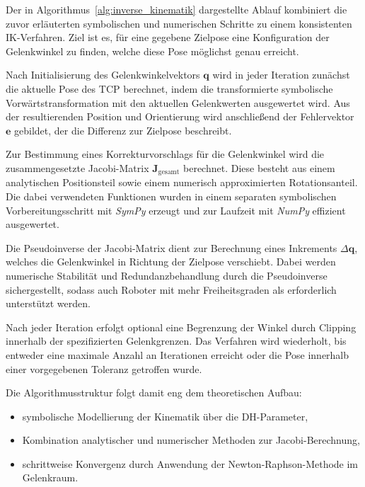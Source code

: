 Der in Algorithmus~\ref{alg:inverse_kinematik} dargestellte Ablauf kombiniert die zuvor erläuterten symbolischen und numerischen Schritte zu einem konsistenten IK-Verfahren. 
Ziel ist es, für eine gegebene Zielpose eine Konfiguration der Gelenkwinkel zu finden, welche diese Pose möglichst genau erreicht.

Nach Initialisierung des Gelenkwinkelvektors $\mathbf{q}$ wird in jeder Iteration zunächst die aktuelle Pose des TCP berechnet,
indem die transformierte symbolische Vor\-wärts\-trans\-for\-ma\-tion mit den aktuellen Gelenkwerten ausgewertet wird. 
Aus der resultierenden Position und Orientierung wird anschließend der Fehlervektor $\mathbf{e}$ gebildet, der die Differenz zur Zielpose beschreibt.

Zur Bestimmung eines Korrekturvorschlags für die Gelenkwinkel wird die zusammengesetzte Jacobi-Matrix $\mathbf{J}_{\text{gesamt}}$ berechnet.
Diese besteht aus einem analytischen Positionsteil sowie einem numerisch approximierten Rotationsanteil.
Die dabei verwendeten Funktionen wurden in einem separaten symbolischen Vorbereitungsschritt mit \textit{SymPy} erzeugt und zur Laufzeit mit \textit{NumPy} effizient ausgewertet.

Die Pseudoinverse der Jacobi-Matrix dient zur Berechnung eines Inkrements $\Delta\mathbf{q}$, welches die Gelenkwinkel in Richtung der Zielpose verschiebt.
Dabei werden numerische Stabilität und Redundanzbehandlung durch die Pseudoinverse sichergestellt, sodass auch Roboter mit mehr Freiheitsgraden als erforderlich unterstützt werden.

Nach jeder Iteration erfolgt optional eine Begrenzung der Winkel durch Clipping innerhalb der spezifizierten Gelenkgrenzen.
Das Verfahren wird wiederholt, bis entweder eine maximale Anzahl an Iterationen erreicht oder die Pose innerhalb einer vorgegebenen Toleranz getroffen wurde.

Die Algorithmusstruktur folgt damit eng dem theoretischen Aufbau:
\vspace{-0.5em}
\begin{itemize}
  \item symbolische Modellierung der Kinematik über die DH-Parameter,
  \item Kombination analytischer und numerischer Methoden zur Jacobi-Berechnung,
  \item schrittweise Konvergenz durch Anwendung der Newton-Raphson-Methode im Gelenkraum.
\end{itemize}


